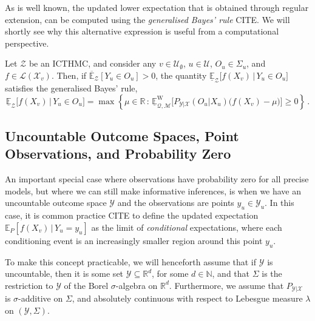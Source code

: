 \documentclass[twoside,11pt]{article}
\newcommand{\nats}{\mathbb{N}}
\newcommand{\reals}{\mathbb{R}}
\newcommand{\states}{\mathcal{X}}
\newcommand{\observs}{\mathcal{Y}}
\newcommand{\lexp}{\underline{\mathbb{E}}_{\rateset,\mathcal{M}}^\mathrm{W}}
\newcommand{\gambles}{\mathcal{L}}
\newcommand{\rateset}{\mathcal{Q}}
\begin{document}
As is well known, the updated lower expectation that is obtained through regular extension, can be computed using the \emph{generalised Bayes' rule} CITE. We will shortly see why this alternative expression is useful from a computational perspective.
\begin{proposition}\label{prop:GBR_regular}
Let $\mathcal{Z}$ be an ICTHMC, and consider any $v\in\mathcal{U}_\emptyset$, $u\in\mathcal{U}$, $O_u\in\Sigma_u$, and $f\in\gambles(\states_v)$. Then, if $\overline{\mathbb{E}}_\mathcal{Z}[Y_u\in O_u] > 0$, the quantity $\underline{\mathbb{E}}_{\mathcal{Z}}\bigl[f(X_v)\,\vert\,Y_u\in O_u\bigr]$ satisfies the generalised Bayes' rule,
\begin{equation*}
\underline{\mathbb{E}}_{\mathcal{Z}}\bigl[f(X_v)\,\vert\,Y_u\in O_u\bigr] = \max\left\{\mu\in\reals\,:\, \lexp\bigl[P_{\observs\vert\states}(O_u\vert X_u)\bigl(f(X_v) - \mu\bigr)\bigr] \geq 0\right\}\,.
\end{equation*}
\end{proposition}

\subsection{Uncountable Outcome Spaces, Point Observations, and Probability Zero}\label{subsec:uncountable}

An important special case where observations have probability zero for all precise models, but where we can still make informative inferences, is when we have an uncountable outcome space $\observs$ and the observations are points $y_u\in\observs_u$. In this case, it is common practice CITE to define the updated expectation $\mathbb{E}_P[f(X_v)\,\vert\,Y_u=y_u]$ as the limit of \emph{conditional} expectations, where each conditioning event is an increasingly smaller region around this point $y_u$.

To make this concept practicable, we will henceforth assume that if $\observs$ is uncountable, then it is some set $\observs\subseteq\reals^d$, for some $d\in\nats$, and that $\Sigma$ is the restriction to $\observs$ of the Borel $\sigma$-algebra on $\reals^d$. Furthermore, we assume that $P_{\observs\vert\states}$ is $\sigma$-additive on $\Sigma$, and absolutely continuous with respect to Lebesgue measure $\lambda$ on $(\observs,\Sigma)$.
\end{document}
